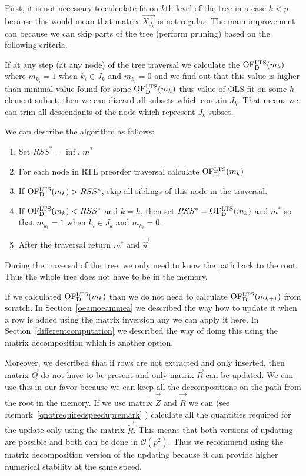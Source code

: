 First, it is not necessary to calculate fit on $k$th level of the tree in a case $k < p$ because this would mean that matrix $\vec{ X_{J_k} }$ is not regular. The main improvement can because we can skip parts of the tree (perform pruning) based on the following criteria. 

If at any step (at any node) of the tree traversal we calculate the
$\operatorname{OF^{LTS}_D}(m_k)$ where $m_{k_i} = 1$ when $k_i \in J_k$ and $m_{k_i} = 0$ and we find out that this value is higher than minimal value found for some $\operatorname{OF^{LTS}_D}(m_h)$ thus value of OLS fit on some $h$ element subset, then we can discard all subsets which contain $J_k$. That means we can trim all descendants of the node which represent $J_k$ subset.

We can describe the algorithm as follows:

\begin{enumerate}
    \item Set $RSS^* = \inf$. $m^*$
    \item For each node in RTL preorder traversal calculate $\operatorname{OF^{LTS}_D}(m_k)$
    \item If $\operatorname{OF^{LTS}_D}(m_k) > RSS^*$, skip all siblings of this node in the traversal.
    \item If $\operatorname{OF^{LTS}_D}(m_k) < RSS^* $ and $k = h$, then set $RSS^* = \operatorname{OF^{LTS}_D}(m_k)$ and $m^*$ so that $m_{k_i} = 1$ when $k_i \in J_k$ and $m_{k_i} = 0$.
 \item After the traversal return $m^*$ and $\vec{\hat{w}}$
\end{enumerate}

During the traversal of the tree, we only need to know the path back to the root. Thus the whole tree does not have to be in the memory. 

\begin{remark}
If we calculated $\operatorname{OF^{LTS}_D}(m_{k})$ than we do not need to calculate $\operatorname{OF^{LTS}_D}(m_{k+1})$ from scratch. In Section~\ref{oeamoeammea} we described the way how to update it when a row is added using the matrix inversion any we can apply it here. In Section~\ref{differentcomputation} we described the way of doing this using the matrix decomposition which is another option. 

Moreover, we described that if rows are not extracted and only inserted, then matrix $\vec{Q}$ do not have to be present and only matrix $\vec{R}$ can be updated. We can use this in our favor because we can keep all the decompositions on the path from the root in the memory.  If we use matrix $\vec{\tilde{Z}}$ and $\vec{\tilde{R}}$ we can  (see Remark~\ref{qnotrequiredspeedupremark} ) calculate all the quantities required for the update only using the matrix $\vec{\tilde{R}}$. This means that both versions of updating are possible and both can be done in $\mathcal{O}(p^2)$. Thus we recommend using the matrix decomposition version of the updating because it can provide higher numerical stability at the same speed.
\end{remark}

